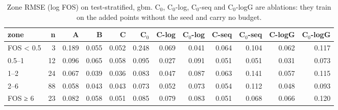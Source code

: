 \begin{table}[htbp]
\centering
\small
\setlength{\tabcolsep}{4pt}
\caption{Zone RMSE (log FOS) on test-stratified, gbm. C$_0$, C$_0$-log, C$_0$-seq and C$_0$-logG are ablations: they train on the added points without the seed and carry no budget.}
\label{tab:test-stratified__fos-rmse:zones_log:gbm}
\begin{tabular}{lrrrrrrrrrrr}
\toprule
zone & n & A & B & C & C$_0$ & C-log & C$_0$-log & C-seq & C$_0$-seq & C-logG & C$_0$-logG \\
\midrule
FOS < 0.5 & 3 & 0.189 & 0.055 & 0.052 & 0.248 & 0.069 & 0.041 & 0.064 & 0.104 & 0.062 & 0.117 \\
0.5–1 & 12 & 0.096 & 0.065 & 0.058 & 0.095 & 0.027 & 0.091 & 0.051 & 0.051 & 0.031 & 0.073 \\
1–2 & 24 & 0.067 & 0.039 & 0.036 & 0.083 & 0.047 & 0.087 & 0.063 & 0.141 & 0.057 & 0.115 \\
2–6 & 88 & 0.058 & 0.043 & 0.043 & 0.073 & 0.052 & 0.073 & 0.054 & 0.112 & 0.048 & 0.093 \\
FOS ≥ 6 & 23 & 0.082 & 0.058 & 0.051 & 0.085 & 0.079 & 0.083 & 0.051 & 0.068 & 0.066 & 0.120 \\
\bottomrule
\end{tabular}
\end{table}
